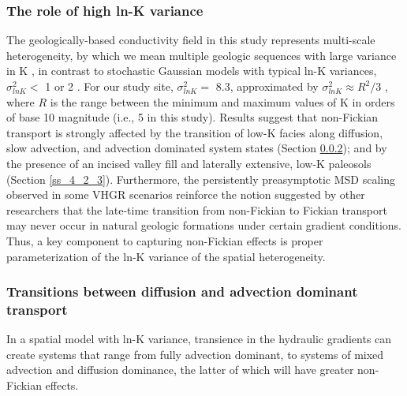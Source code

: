 %
\subsubsection{The role of high ln-K variance}
\label{ss_4_2_1}

The geologically-based conductivity field in this study represents multi-scale heterogeneity, by which we mean multiple geologic sequences with large variance in K \citep{weissmann1999multi}, in contrast to stochastic Gaussian models with typical ln-K variances, $\sigma^2_{lnK} < $ 1 or 2 \citep{gelhar1993stochastic, rubin2003applied}. For our study site, $\sigma^2_{lnK} = $ 8.3, approximated by $\sigma^2_{lnK} \approx R^2/3$ \citep{fogg2016debates}, where $R$ is the range between the minimum and maximum values of K in orders of base 10 magnitude (i.e., 5 in this study).  Results suggest that non-Fickian transport is strongly affected by the transition of low-K facies along diffusion, slow advection, and advection dominated system states (Section \ref{ss_4_2_2}); and by the presence of an incised valley fill and laterally extensive, low-K paleosols (Section \ref{ss_4_2_3}). Furthermore, the persistently preasymptotic MSD scaling observed in some VHGR scenarios reinforce the notion suggested by other researchers \citep[e.g.][]{matheron1980transport, neuman1990universal, zhang2007persistence} that the late-time transition from non-Fickian to Fickian transport may never occur in natural geologic formations under certain gradient conditions. Thus, a key component to capturing non-Fickian effects is proper parameterization of the ln-K variance of the spatial heterogeneity.

%
\subsubsection{Transitions between diffusion and advection dominant transport}
\label{ss_4_2_2}
In a spatial model with ln-K variance, transience in the hydraulic gradients can create systems that range from fully advection dominant, to systems of mixed advection and diffusion dominance, the latter of which will have greater non-Fickian effects.

